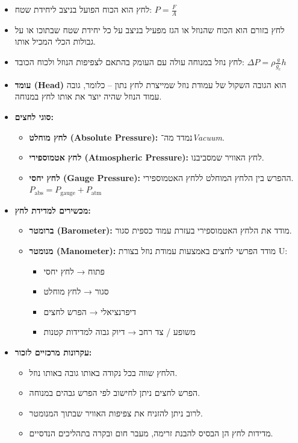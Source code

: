 \documentclass[
  hebrew,
  letterpaper,
  DIV=11,
  numbers=noendperiod]{scrreprt}
\providecommand{\tightlist}{%
  \setlength{\itemsep}{0pt}\setlength{\parskip}{0pt}}
\begin{document}
\begin{itemize}
\tightlist
\item
  לחץ הוא הכוח הפועל בניצב ליחידת שטח: \(P = \frac{F}{A}\)
\item
  לחץ בזורם הוא הכוח שהנוזל או הגז מפעיל בניצב על כל יחידת שטח שבתוכו או
  על גבולות הכלי המכיל אותו.
\item
  לחץ נוזל במנוחה עולה עם העומק בהתאם לצפיפות הנוזל ולכוח הכובד:
  \(\Delta P = \rho \frac{g}{g_{c}} h\)
\item
  \textbf{עומד (Head)} הוא הגובה השקול של עמודת נוזל שמייצרת לחץ נתון --
  כלומר, גובה עמוד הנוזל שהיה יוצר את אותו לחץ במנוחה.
\item
  \textbf{סוגי לחצים:}

  \begin{itemize}
  \tightlist
  \item
    \textbf{לחץ מוחלט (Absolute Pressure):} נמדד מה־\emph{Vacuum}.
  \item
    \textbf{לחץ אטמוספירי (Atmospheric Pressure):} לחץ האוויר שמסביבנו.
  \item
    \textbf{לחץ יחסי (Gauge Pressure):} ההפרש בין הלחץ המוחלט ללחץ
    האטמוספירי.\\
    \(P_{\text{abs}} = P_{\text{gauge}} + P_{\text{atm}}\)
  \end{itemize}
\item
  \textbf{מכשירים למדידת לחץ:}

  \begin{itemize}
  \tightlist
  \item
    \textbf{ברומטר (Barometer):} מודד את הלחץ האטמוספירי בעזרת עמוד
    כספית סגור.
  \item
    \textbf{מנומטר (Manometer):} מודד הפרשי לחצים באמצעות עמודת נוזל
    בצורת U:

    \begin{itemize}
    \tightlist
    \item
      פתוח → לחץ יחסי\\
    \item
      סגור → לחץ מוחלט\\
    \item
      דיפרנציאלי → הפרש לחצים\\
    \item
      משופע / צד רחב → דיוק גבוה למדידות קטנות
    \end{itemize}
  \end{itemize}
\item
  \textbf{עקרונות מרכזיים לזכור:}

  \begin{itemize}
  \tightlist
  \item
    הלחץ שווה בכל נקודה באותו גובה באותו נוזל.
  \item
    הפרש לחצים ניתן לחישוב לפי הפרש גבהים במנוחה.
  \item
    לרוב ניתן להזניח את צפיפות האוויר שבתוך המנומטר.
  \item
    מדידות לחץ הן הבסיס להבנת זרימה, מעבר חום ובקרה בתהליכים הנדסיים.
  \end{itemize}
\end{itemize}
\end{document}

